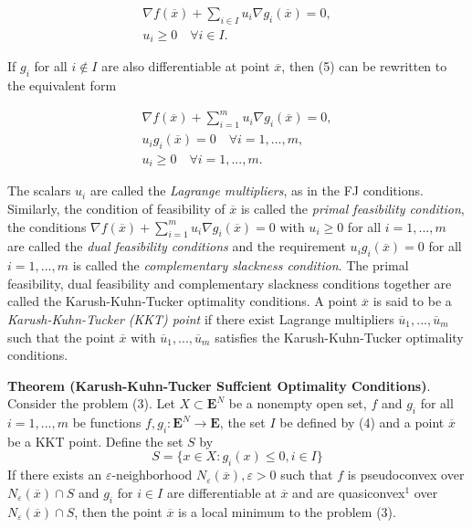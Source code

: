 \documentclass[a4]{report}
\theoremstyle{definition}
\begin{document}
{\begin{align*}
\nabla f(\overline{x}) + \sum_{i \in I} u_{i} \nabla g_{i}(\overline{x}) = 0, \\
u_{i} \geq 0 \quad \forall i \in I.
\end{align*}

If $g_{i}$ for all $i \notin I$ are also differentiable at point $\overline{x}$, then (5) can be rewritten to the
equivalent form

\begin{align*}
\nabla f(\overline{x}) + \sum_{i = 1}^{m} u_{i} \nabla g_{i}(\overline{x}) = 0, \\
u_{i}g_{i}(\overline{x}) = 0 \quad \forall i=1,...,m,\\
u_{i} \geq 0 \quad \forall i=1,...,m.
\end{align*}

The scalars $u_{i}$ are called the \textit{Lagrange multipliers}, as in the FJ conditions. Similarly,
the condition of feasibility of $\overline{x}$ is called the \textit{primal feasibility condition}, the conditions
$\nabla f(\overline{x}) + \sum_{i=1}^{m} u_{i} \nabla g_{i}(\overline{x}) = 0$ with $u_{i} \geq 0$ for all $i = 1,...,m$ are called the \textit{dual feasibility conditions} and the requirement $u_{i}g_{i}(\overline{x}) = 0$ for all $i = 1,...,m$ is called the 
\textit{complementary slackness condition}. The primal feasibility, dual feasibility and complementary
slackness conditions together are called the Karush-Kuhn-Tucker optimality conditions.
A point $\overline{x}$ is said to be a \textit{Karush-Kuhn-Tucker (KKT) point} if there exist Lagrange
multipliers $\overline{u}_{1}, ..., \overline{u}_{m}$ such that the point $\overline{x}$ with $\overline{u}_{1}, ..., \overline{u}_{m}$ satisfies the Karush-Kuhn-Tucker optimality conditions.
\bigskip

\textbf{Theorem (Karush-Kuhn-Tucker Suffcient Optimality Conditions)}. 
Consider the problem (3). Let $X \subset \mathbf{E}^{N}$ be a nonempty open set, $f$ and $g_{i}$ for all $i = 1,...,m$ be
functions $f, g_{i}: \mathbf{E}^{N} \rightarrow \mathbf{E}$, the set $I$ be defined by (4) and a point $\overline{x}$ be a KKT point.
Define the set $S$ by
$$S = \{ x \in X: g_{i}(x) \leq 0, i \in I \} $$
If there exists an $\varepsilon $-neighborhood $N_{\varepsilon}(\overline{x}), \varepsilon > 0$ such that $f$ is pseudoconvex over $N_{\varepsilon}(\overline{x}) \cap S$
and $g_{i}$ for $i \in I$ are differentiable at $\overline{x}$ and are quasiconvex$^{1}$ over $N_{\varepsilon}(\overline{x}) \cap S$, 
then the point $\overline{x}$ is a local minimum to the problem (3).

}
\end{document}
